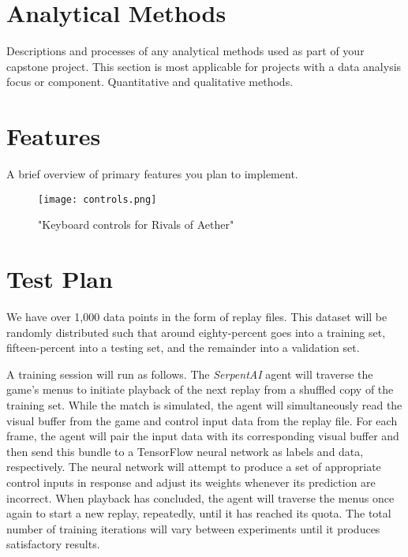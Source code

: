 


\section{Analytical Methods}

Descriptions and processes of any analytical methods used as part of your capstone project. This section is most applicable for projects with a data analysis focus or component. Quantitative and qualitative methods.




\section{Features}

A brief overview of primary features you plan to implement.

\begin{figure}
	\caption{"Keyboard controls for Rivals of Aether"}
	\centering
	\texttt{[image: controls.png]} \\
\end{figure}




\section{Test Plan}

We have over 1,000 data points in the form of replay files. This dataset will be randomly distributed such that around eighty-percent goes into a training set, fifteen-percent into a testing set, and the remainder into a validation set.

A training session will run as follows. The {\it SerpentAI} agent will traverse the game's menus to initiate playback of the next replay from a shuffled copy of the training set. While the match is simulated, the agent will simultaneously read the visual buffer from the game and control input data from the replay file. For each frame, the agent will pair the input data with its corresponding visual buffer and then send this bundle to a TensorFlow neural network as labels and data, respectively. The neural network will attempt to produce a set of appropriate control inputs in response and adjust its weights  whenever its prediction are incorrect. When playback has concluded, the agent will traverse the menus once again to start a new replay, repeatedly, until it has reached its quota. The total number of training iterations will vary between experiments until it produces satisfactory results.

